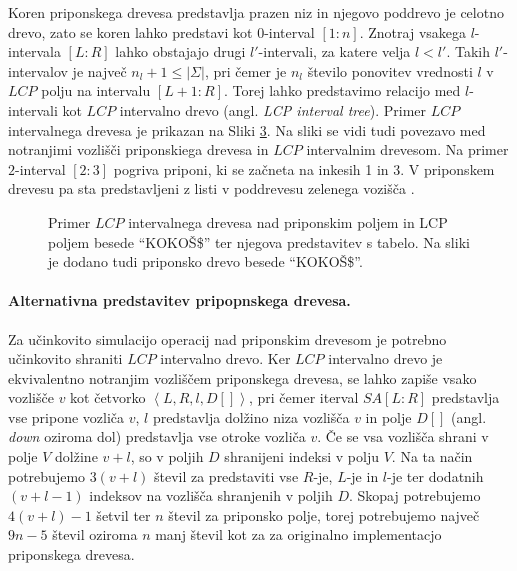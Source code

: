 Koren priponskega drevesa predstavlja prazen niz in njegovo poddrevo je celotno drevo, zato se koren lahko predstavi kot $0$-interval $[1:n]$. Znotraj vsakega $l$-intervala $[L:R]$ lahko obstajajo drugi $l'$-intervali, za katere velja $l<l'$. Takih $l'$-intervalov je največ $n_l+1\le |\Sigma|$, pri čemer je $n_l$ število ponovitev vrednosti $l$ v $LCP$ polju na intervalu $[L+1:R]$. Torej lahko predstavimo relacijo med $l$-intervali kot $LCP$ intervalno drevo (angl. \textit{LCP interval tree}). Primer $LCP$ intervalnega drevesa je prikazan na Sliki \ref{fig:intervalTree}. Na sliki se vidi tudi povezavo med notranjimi vozlišči priponskiega drevesa in $LCP$ intervalnim drevesom. Na primer $2$-interval $[2:3]$ pogriva priponi, ki se začneta na inkesih 1 in 3. V priponskem drevesu pa sta predstavljeni z listi v poddrevesu zelenega vozišča \cite{Abouelhoda2004}.

\begin{figure}[tb]
    \begin{subfigure}[C]{0.45\linewidth}
        \vfill       
        
        \centering
        \vfill
        \subcaption*{}
        \label{fig:aSADrevo}
    \end{subfigure}
    \hfill
    \begin{subfigure}[C]{0.45\linewidth}        
        
        \centering
        \subcaption*{}
        \label{fig:aSAPolje}
    \end{subfigure}
   
    \caption{Primer $LCP$ intervalnega drevesa nad priponskim poljem in LCP poljem besede \enquote{KOKOŠ\$} ter njegova predstavitev s tabelo. Na sliki je dodano tudi priponsko drevo besede \enquote{KOKOŠ\$}.} 
    \label{fig:intervalTree}
\end{figure}

\paragraph{Alternativna predstavitev pripopnskega drevesa.}

Za učinkovito simulacijo operacij nad priponskim drevesom je potrebno učinkovito shraniti $LCP$ intervalno drevo. Ker $LCP$ intervalno drevo je ekvivalentno notranjim vozliščem priponskega drevesa, se lahko zapiše vsako vozlišče $v$ kot četvorko $\left< L, R, l, D[] \right>$, pri čemer iterval $SA[L:R]$ predstavlja vse pripone vozliča $v$, $l$ predstavlja dolžino niza vozlišča $v$ in polje $D[]$ (angl. \textit{down} oziroma dol) predstavlja vse otroke vozliča $v$. Če se vsa vozlišča shrani v polje $V$ dolžine $v+l$, so v poljih $D$ shranijeni indeksi v polju $V$. Na ta način potrebujemo $3(v+l)$ števil za predstaviti vse $R$-je, $L$-je in $l$-je ter dodatnih $(v+l-1)$ indeksov na vozlišča shranjenih v poljih $D$. Skopaj potrebujemo $4(v+l)-1$ šetvil ter $n$ števil za priponsko polje, torej potrebujemo največ $9n-5$ števil oziroma $n$ manj števil kot za za originalno implementacjo priponskega drevesa. 

